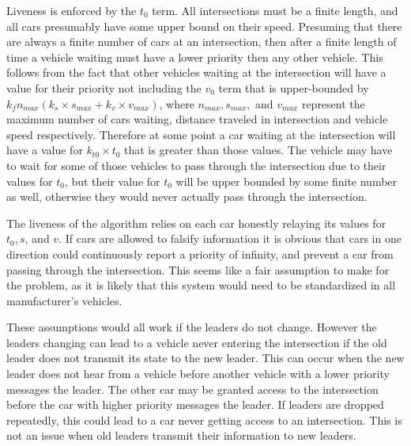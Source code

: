 \documentclass[12pt]{article}
\begin{document}
Liveness is enforced by the $t_0$ term. All intersections must be a finite length, and all cars presumably have some upper bound on their speed. Presuming that there are always a finite number of cars at an intersection, then after a finite length of time a vehicle waiting must have a lower priority then any other vehicle. This follows from the fact that other vehicles waiting at the intersection will have a value for their priority not including the $v_0$ term that is upper-bounded by $k_fn_{max}(k_s \times s_{max} + k_v \times v_{max})$, where $n_{max}, s_{max},$ and $v_{max}$ represent the maximum number of cars waiting, distance traveled in intersection and vehicle speed respectively. Therefore at some point a car waiting at the intersection will have a value for $k_{t0} \times t_0$ that is greater than those values. The vehicle may have to wait for some of those vehicles to pass through the intersection due to their values for $t_0$, but their value for $t_0$ will be upper bounded by some finite number as well, otherwise they would never actually pass through the intersection.\par
The liveness of the algorithm relies on each car honestly relaying its values for $t_0, s$, and $v$. If cars are allowed to falsify information it is obvious that cars in one direction could continuously report a priority of infinity, and prevent a car from passing through the intersection. This seems like a fair assumption to make for the problem, as it is likely that this system would need to be standardized in all manufacturer's vehicles. \par
These assumptions would all work if the leaders do not change. However the leaders changing can lead to a vehicle never entering the intersection if the old leader does not transmit its state to the new leader. This can occur when the new leader does not hear from a vehicle before another vehicle with a lower priority messages the leader. The other car may be granted access to the intersection before the car with higher priority messages the leader. If leaders are dropped repeatedly, this could lead to a car never getting access to an intersection. This is not an issue when old leaders transmit their information to new leaders.
\end{document}
